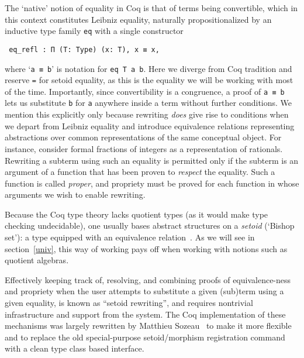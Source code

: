 \documentclass[a4paper,10pt,runningheads]{llncs}
\begin{document}


The `native' notion of equality in Coq is that of terms being convertible, which in this context constitutes Leibniz equality, naturally propositionalized by an inductive type family \lstinline|eq| with a single constructor
\begin{lstlisting}
 eq_refl : Π (T: Type) (x: T), x ≡ x,
\end{lstlisting}
where `\lstinline|a ≡ b|' is notation for \lstinline|eq T a b|. Here we diverge from Coq tradition and reserve \lstinline|=| for setoid equality, as this is the equality we will be working with most of the time. Importantly, since convertibility is a congruence, a proof of \lstinline|a ≡ b| lets us substitute \lstinline|b| for \lstinline|a| anywhere inside a term without further conditions. We mention this explicitly only because rewriting \emph{does} give rise to conditions when we depart from Leibniz equality and introduce equivalence relations representing abstractions over common representations of the same conceptual object. For instance, consider formal fractions of integers as a representation of rationals. Rewriting a subterm using such an equality is permitted only if the subterm is an argument of a function that has been proven to \emph{respect} the equality. Such a function is called \emph{proper}, and propriety must be proved for each function in whose arguments we wish to enable rewriting.

Because the Coq type theory lacks quotient types (as it would make type checking undecidable), one usually bases abstract structures on a \emph{setoid} (`Bishop set'): a type equipped with an equivalence relation~\cite{Bishop67,Hofmann,Capretta}. As we will see in section~\ref{univ}, this way of working pays off when working with notions such as quotient algebras.

Effectively keeping track of, resolving, and combining proofs of equivalence-ness and propriety when the user attempts to substitute a given (sub)term using a given equality, is known as ``setoid rewriting'', and requires nontrivial infrastructure and support from the system. The Coq implementation of these mechanisms was largely rewritten by Matthieu Sozeau~\cite{Setoid-rewrite} to make it more flexible and to replace the old special-purpose setoid/morphism registration command with a clean type class based interface.
\end{document}
